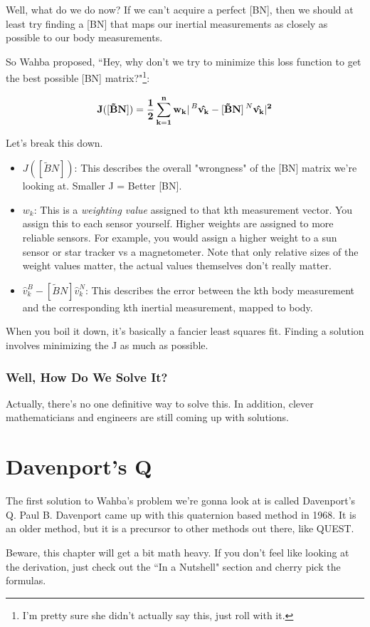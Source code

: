 \documentclass[a4paper,14pt]{extreport}
\newcommand{\vk}[1]{\prescript{#1}{}{\hat{v_k}}}
\begin{document}
Well, what do we do now? If we can't acquire a perfect [BN], then we should at least try finding a [BN] that maps our inertial measurements as closely as possible to our body measurements. 

So Wahba proposed, ``Hey, why don't we try to minimize this loss function to get the best possible [BN] matrix?"\footnote{I'm pretty sure she didn't actually say this, just roll with it.}:

\[
\mathbf{
J([\tilde{B}N]) = \dfrac{1}{2} \sum^n_{k=1} w_k |\vk{B} - [\tilde{B}N]\vk{N}|^2}
\]

Let's break this down.
\begin{itemize}
\item{$J([\tilde{B}N])$: This describes the overall "wrongness" of the [BN] matrix we're looking at. Smaller J = Better [BN].
}
\item{$w_k$: This is a \emph{weighting value} assigned to that kth measurement vector. You assign this to each sensor yourself. Higher weights are assigned to more reliable sensors. For example, you would assign a higher weight to a sun sensor or star tracker vs a magnetometer. Note that only relative sizes of the weight values matter, the actual values themselves don't really matter.
}
\item{$\hat{v}_k^B - [\tilde{B}N]\hat{v}_k^N$: This describes the error between the kth body measurement and the corresponding kth inertial measurement, mapped to body.}
\end{itemize}

When you boil it down, it's basically a fancier least squares fit. Finding a solution involves minimizing the J as much as possible.

\subsection{Well, How Do We Solve It?}
Actually, there's no one definitive way to solve this. In addition, clever mathematicians and engineers are still coming up with solutions.
\chapter{Davenport's Q}
The first solution to Wahba's problem we're gonna look at is called Davenport's Q. Paul B. Davenport came up with this quaternion based method in 1968. It is an older method, but it is a precursor to other methods out there, like QUEST. 

Beware, this chapter will get a bit math heavy. If you don't feel like looking at the derivation, just check out the ``In a Nutshell" section and cherry pick the formulas.
\end{document}
